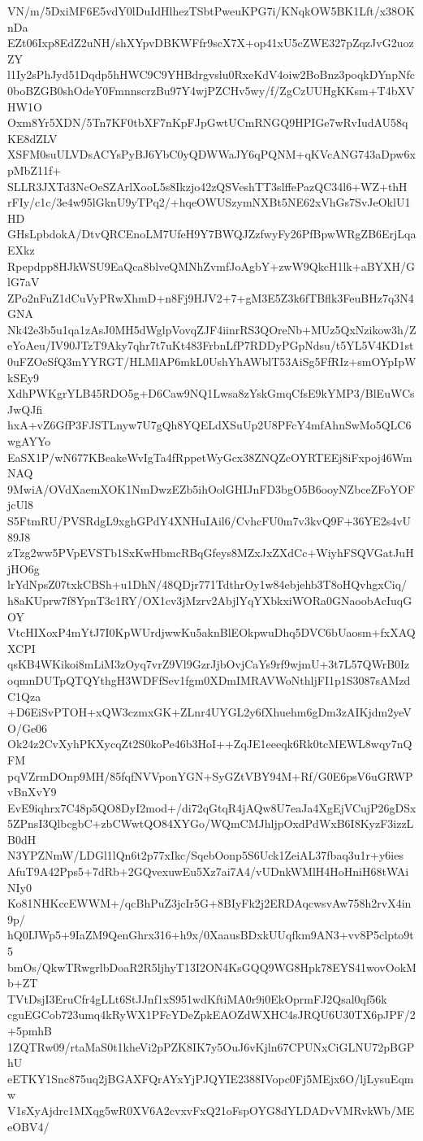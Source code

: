 VN/m/5DxiMF6E5vdY0lDuIdHlhezTSbtPweuKPG7i/KNqkOW5BK1Lft/x38OKnDa
EZt06Ixp8EdZ2uNH/shXYpvDBKWFfr9scX7X+op41xU5cZWE327pZqzJvG2uozZY
l1Iy2sPhJyd51Dqdp5hHWC9C9YHBdrgvslu0RxeKdV4oiw2BoBnz3poqkDYnpNfc
0boBZGB0shOdeY0FmnnscrzBu97Y4wjPZCHv5wy/f/ZgCzUUHgKKsm+T4bXVHW1O
Oxm8Yr5XDN/5Tn7KF0tbXF7nKpFJpGwtUCmRNGQ9HPIGe7wRvIudAU58qKE8dZLV
XSFM0suULVDsACYsPyBJ6YbC0yQDWWaJY6qPQNM+qKVcANG743aDpw6xpMbZ11f+
SLLR3JXTd3NcOeSZArlXooL5s8Ikzjo42zQSVeshTT3slffePazQC34l6+WZ+thH
rFIy/c1c/3e4w95lGknU9yTPq2/+hqeOWUSzymNXBt5NE62xVhGs7SvJeOklU1HD
GHsLpbdokA/DtvQRCEnoLM7UfeH9Y7BWQJZzfwyFy26PfBpwWRgZB6ErjLqaEXkz
Rpepdpp8HJkWSU9EaQca8blveQMNhZvmfJoAgbY+zwW9QkcH1lk+aBYXH/GlG7aV
ZPo2nFuZ1dCuVyPRwXhmD+n8Fj9HJV2+7+gM3E5Z3k6fTBflk3FeuBHz7q3N4GNA
Nk42e3b5u1qa1zAsJ0MH5dWglpVovqZJF4iinrRS3QOreNb+MUz5QxNzikow3h/Z
eYoAeu/IV90JTzT9Aky7qhr7t7uKt483FrbnLfP7RDDyPGpNdsu/t5YL5V4KD1st
0uFZOeSfQ3mYYRGT/HLMlAP6mkL0UshYhAWblT53AiSg5FfRIz+smOYpIpWkSEy9
XdhPWKgrYLB45RDO5g+D6Caw9NQ1Lwsa8zYskGmqCfsE9kYMP3/BlEuWCsJwQJfi
hxA+vZ6GfP3FJSTLnyw7U7gQh8YQELdXSuUp2U8PFcY4mfAhnSwMo5QLC6wgAYYo
EaSX1P/wN677KBeakeWvIgTa4fRppetWyGcx38ZNQZcOYRTEEj8iFxpoj46WmNAQ
9MwiA/OVdXaemXOK1NmDwzEZb5ihOolGHIJnFD3bgO5B6ooyNZbceZFoYOFjcUl8
S5FtmRU/PVSRdgL9xghGPdY4XNHuIAil6/CvhcFU0m7v3kvQ9F+36YE2s4vU89J8
zTzg2ww5PVpEVSTb1SxKwHbmcRBqGfeys8MZxJxZXdCc+WiyhFSQVGatJuHjHO6g
lrYdNpsZ07txkCBSh+u1DhN/48QDjr771TdthrOy1w84ebjehb3T8oHQvhgxCiq/
h8aKUprw7f8YpnT3c1RY/OX1cv3jMzrv2AbjlYqYXbkxiWORa0GNaoobAcIuqGOY
VtcHIXoxP4mYtJ7I0KpWUrdjwwKu5aknBlEOkpwuDhq5DVC6bUaosm+fxXAQXCPI
qsKB4WKikoi8mLiM3zOyq7vrZ9Vl9GzrJjbOvjCaYs9rf9wjmU+3t7L57QWrB0Iz
oqmnDUTpQTQYthgH3WDFfSev1fgm0XDmIMRAVWoNthljFI1p1S3087sAMzdC1Qza
+D6EiSvPTOH+xQW3czmxGK+ZLnr4UYGL2y6fXhuehm6gDm3zAIKjdm2yeVO/Ge06
Ok24z2CvXyhPKXycqZt2S0koPe46b3HoI++ZqJE1eeeqk6Rk0tcMEWL8wqy7nQFM
pqVZrmDOnp9MH/85fqfNVVponYGN+SyGZtVBY94M+Rf/G0E6psV6uGRWPvBnXvY9
EvE9iqhrx7C48p5QO8DyI2mod+/di72qGtqR4jAQw8U7eaJa4XgEjVCujP26gDSx
5ZPnsI3QlbcgbC+zbCWwtQO84XYGo/WQmCMJhljpOxdPdWxB6I8KyzF3izzLB0dH
N3YPZNmW/LDGl1lQn6t2p77xIkc/SqebOonp5S6Uck1ZeiAL37fbaq3u1r+y6ies
AfuT9A42Pps5+7dRb+2GQvexuwEu5Xz7ai7A4/vUDnkWMlH4HoHniH68tWAiNIy0
Ko81NHKccEWWM+/qcBhPuZ3jcIr5G+8BIyFk2j2ERDAqcwsvAw758h2rvX4in9p/
hQ0IJWp5+9IaZM9QenGhrx316+h9x/0XaausBDxkUUqfkm9AN3+vv8P5clpto9t5
bmOs/QkwTRwgrlbDoaR2R5ljhyT13I2ON4KsGQQ9WG8Hpk78EYS41wovOokMb+ZT
TVtDsjI3EruCfr4gLLt6StJJnf1xS951wdKftiMA0r9i0EkOprmFJ2Qsal0qf56k
cguEGCob723umq4kRyWX1PFcYDeZpkEAOZdWXHC4sJRQU6U30TX6pJPF/2+5pmhB
1ZQTRw09/rtaMaS0t1kheVi2pPZK8IK7y5OuJ6vKjln67CPUNxCiGLNU72pBGPhU
eETKY1Snc875uq2jBGAXFQrAYxYjPJQYIE2388IVopc0Fj5MEjx6O/ljLysuEqmw
V1sXyAjdrc1MXqg5wR0XV6A2cvxvFxQ21oFspOYG8dYLDADvVMRvkWb/MEeOBV4/
